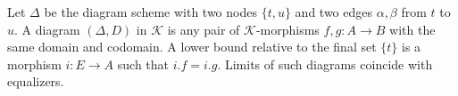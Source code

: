 Let $\Delta$ be the diagram scheme with two nodes $\{t, u\}$ and two edges $\alpha, \beta$ from $t$ to $u$. A diagram $(\Delta, D)$ in $\mathcal{K}$ is any pair of $\mathcal{K}$-morphisms $f, g: A \longrightarrow B$ with the same domain and codomain. A lower bound relative to the final set $\{t\}$ is a morphism $i: E \longrightarrow A$ such that $i.f = i.g$. Limits of such diagrams coincide with equalizers.
